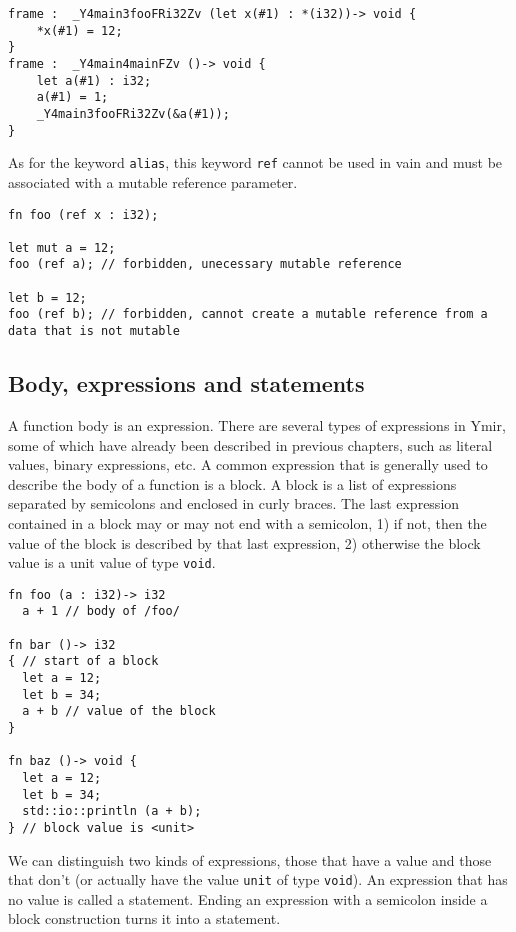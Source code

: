 \begin {lstlisting}[style=intermediateVerb]
frame :  _Y4main3fooFRi32Zv (let x(#1) : *(i32))-> void {
    *x(#1) = 12;
}
frame :  _Y4main4mainFZv ()-> void {
    let a(#1) : i32;
    a(#1) = 1;
    _Y4main3fooFRi32Zv(&a(#1));
}
\end{lstlisting}

 As for the keyword
\texttt{alias}, this keyword \texttt{ref} cannot be used in vain and must be
associated with a mutable reference parameter.

\begin{lstlisting}[style=coloredverbatim]
fn foo (ref x : i32);

let mut a = 12;
foo (ref a); // forbidden, unecessary mutable reference

let b = 12;
foo (ref b); // forbidden, cannot create a mutable reference from a data that is not mutable
\end{lstlisting}

\subsection {Body, expressions and statements}

A function body is an expression. There are several types of expressions in
Ymir, some of which have already been described in previous chapters, such as
literal values, binary expressions, etc. A common expression that is generally
used to describe the body of a function is a block. A block is a list of
expressions separated by semicolons and enclosed in curly braces. The last
expression contained in a block may or may not end with a semicolon, 1) if not,
then the value of the block is described by that last expression, 2) otherwise
the block value is a unit value of type \texttt{void}.

\begin{lstlisting}[style=coloredverbatim]
fn foo (a : i32)-> i32
  a + 1 // body of /foo/

fn bar ()-> i32
{ // start of a block
  let a = 12;
  let b = 34;
  a + b // value of the block
}

fn baz ()-> void {
  let a = 12;
  let b = 34;
  std::io::println (a + b);
} // block value is <unit>

\end{lstlisting}

We can distinguish two kinds of expressions, those that have a value and those
that don't (or actually have the value \texttt{unit} of type \texttt{void}). An
expression that has no value is called a statement. Ending an expression with a
semicolon inside a block construction turns it into a statement.

